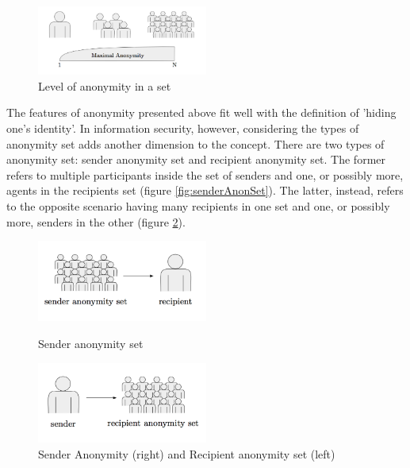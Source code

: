 \begin{figure}[h]
    \centering
    \includegraphics[width=0.50\textwidth]{Images/anonymityLevel.png}
    \caption{Level of anonymity in a set \cite{Franck}}
    \label{fig:anonymity}
\end{figure}

The features of anonymity presented above fit well with the definition of 'hiding one's identity'. 
In information security, however, considering the types of anonymity set adds another dimension to the concept. There are two types of anonymity set: sender anonymity set and recipient anonymity set. The former refers to multiple participants inside the set of senders and one, or possibly more, agents in the recipients set (figure \ref{fig:senderAnonSet}). The latter, instead, refers to the opposite scenario having many recipients in one set and one, or possibly more, senders in the other (figure \ref{fig:receipientAnonSet}).


\begin{figure}[h]
\centering
\begin{minipage}{.5\textwidth}
    \centering
    \includegraphics[width=0.50\textwidth]{Images/ReceiverAnonymSet.png}
    \caption{Sender anonymity set \cite{Franck}}
    \label{fig:senderAnonSet}
\end{minipage}%
\begin{minipage}{.5\textwidth}
    \centering
    \includegraphics[width=0.50\textwidth]{Images/senderAnonymSet.png}
    \caption{Sender Anonymity (right) and Recipient anonymity set (left) \cite{Franck}}
    \label{fig:receipientAnonSet}
\end{minipage}
\end{figure}



